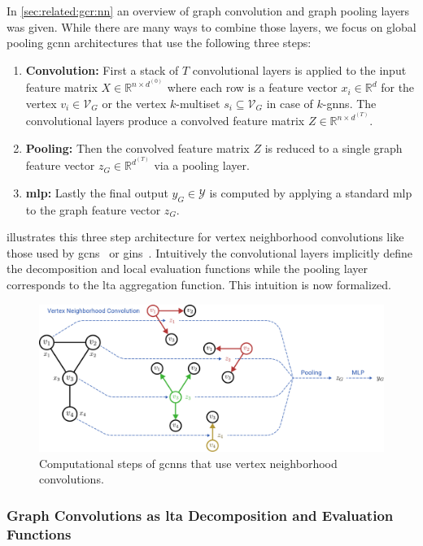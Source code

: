 In \cref{sec:related:gcr:nn} an overview of graph convolution and graph pooling layers was given.
While there are many ways to combine those layers, we focus on global pooling \ac{gcnn} architectures that use the following three steps:
\begin{enumerate}[label=\textbf{\arabic*.}]
	\item \textbf{Convolution:}
		First a stack of $T$ convolutional layers is applied to the input feature matrix $X \in \mathbb{R}^{n \times d^{(0)}}$ where each row is a feature vector $x_i \in \mathbb{R}^d$ for the vertex $v_i \in \mathcal{V}_G$ or the vertex $k$-multiset $s_i \subseteq \mathcal{V}_G$ in case of $k$-\acsp{gnn}.
		The convolutional layers produce a convolved feature matrix $Z \in \mathbb{R}^{n \times d^{(T)}}$.
	\item \textbf{Pooling:}
		Then the convolved feature matrix $Z$ is reduced to a single graph feature vector $z_G \in \mathbb{R}^{d^{(T)}}$ via a pooling layer.
	\item \textbf{\ac{mlp}:}
		Lastly the final output $y_G \in \mathcal{Y}$ is computed by applying a standard \ac{mlp} to the graph feature vector $z_G$.
\end{enumerate}
 illustrates this three step architecture for vertex neighborhood convolutions like those used by \acp{gcn}~\cite{Kipf2017} or \acp{gin}~\cite{Xu2018}.
Intuitively the convolutional layers implicitly define the decomposition and local evaluation functions while the pooling layer corresponds to the \ac{lta} aggregation function.
This intuition is now formalized.
\begin{figure}[ht]
	\centering
	\includegraphics[width=\linewidth]{gfx/graph-lta/gcnn-structure.pdf}
	\caption{
		Computational steps of \acp{gcnn} that use vertex neighborhood convolutions.
	}\label{fig:ltag:gcnn-structure}
\end{figure}

\subsubsection{Graph Convolutions as \ac*{lta} Decomposition and Evaluation Functions}


